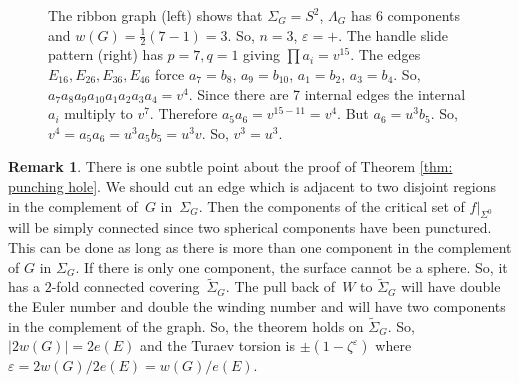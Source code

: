\documentclass[JEP,XML,SOM,Unicode,NoFloatCountersInSection]{cedram}
\theoremstyle{plain}
\theoremstyle{definition}
\newtheorem{remark}[theorem]{Remark}
\let\ve\varepsilon
\begin{document}
\begin{figure}[htbp]
\begin{center}
\caption{\smaller The ribbon graph (left) shows that $\Sigma_G=S^2$, $\Lambda_G$ has 6 components and $w(G)=\frac12(7-1)=3$. So, $n=3$, $\varepsilon=+$. The handle slide pattern (right) has $p=7,q=1$ giving $\prod a_i=v^{15}$. The edges $E_{16},E_{26},E_{36},E_{46}$ force $a_7=b_8$, $a_9=b_{10}$, $a_1=b_2$, $a_3=b_4$. So, $a_7a_8a_9a_{10}a_1a_2a_3a_4=v^4$. Since there are 7 internal edges the internal $a_i$ multiply to $v^7$. Therefore $a_5a_6=v^{15-11}=v^4$. But $a_6=u^3b_5$. So, $v^4=a_5a_6=u^3a_5b_5=u^3v$. So, $v^3=u^3$.}
\label{FigureCA2}
\end{center}
\end{figure}

\begin{remark}
There is one subtle point about the proof of Theorem \ref{thm: punching hole}. We should cut an edge which is adjacent to two disjoint regions in the complement of~$G$ in~$\Sigma_G$. Then the components of the critical set of $f|_{\Sigma^0}$ will be simply connected since two spherical components have been punctured. This can be done as long as there is more than one component in the complement of $G$ in $\Sigma_G$. If there is only one component, the surface cannot be a sphere. So, it has a $2$-fold connected covering~$\widetilde \Sigma_G$. The pull back of~$W$ to $\widetilde \Sigma_G$ will have double the Euler number and double the winding number and will have two components in the complement of the graph. So, the theorem holds on $\widetilde\Sigma_G$. So, $|2w(G)|=2e(E)$ and the Turaev torsion is $\pm(1-\zeta^\ve)$ where $\ve=2w(G)/2e(E)=w(G)/e(E)$.
\end{remark}
\end{document}
